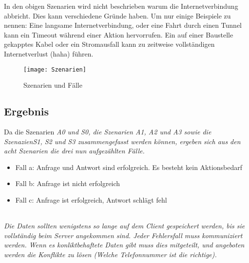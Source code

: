 In den obigen Szenarien wird nicht beschrieben warum die Internetverbindung abbricht. Dies kann verschiedene Gründe haben. Um nur einige Beispiele zu nennen: Eine langsame Internetverbindung, oder eine Fahrt durch einen Tunnel kann ein Timeout während einer Aktion hervorrufen. Ein auf einer Baustelle gekapptes Kabel oder ein Stromausfall kann zu zeitweise vollständigen Internetverlust (haha) führen.
\begin{figure}[H]
  \centering
  \texttt{[image: Szenarien]}
  \grayRule
  \caption[Szenarien]{Szenarien und Fälle}
  \label{fig:scenarios}
\end{figure}
%
%
\subsection*{Ergebnis}
Da die Szenarien \it{A0} und \it{S0}, die Szenarien \it{A1}, \it{A2} und \it{A3} sowie die Szenazien\it{S1}, \it{S2} und \it{S3} zusammengefasst werden können, ergeben sich aus den acht Szenarien die drei nun aufgezählten Fälle.
\begin{itemize}
  \item Fall a: Anfrage und Antwort sind erfolgreich. Es besteht kein Aktionsbedarf 
  \item Fall b: Anfrage ist nicht erfolgreich
  \item Fall c: Anfrage ist erfolgreich, Antwort schlägt fehl
\end{itemize}
\\
\it{Die Daten sollten wenigstens so lange auf dem Client gespeichert werden, bis sie vollständig beim Server angekommen sind. Jeder Fehlersfall muss kommuniziert werden. Wenn es konliktbehaftete Daten gibt muss dies mitgeteilt, und angeboten werden die Konflikte zu lösen (Welche Telefonnummer ist die richtige).}